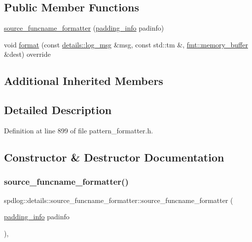 \subsection*{Public Member Functions}
\begin{DoxyCompactItemize}
\item 
\hyperlink{classspdlog_1_1details_1_1source__funcname__formatter_a1f20c622f780c9f9e8696e9c5960dcb8}{source\+\_\+funcname\+\_\+formatter} (\hyperlink{structspdlog_1_1details_1_1padding__info}{padding\+\_\+info} padinfo)
\item 
void \hyperlink{classspdlog_1_1details_1_1source__funcname__formatter_a7628b8914c638affa0bf0fc9de62f0e4}{format} (const \hyperlink{structspdlog_1_1details_1_1log__msg}{details\+::log\+\_\+msg} \&msg, const std\+::tm \&, \hyperlink{format_8h_a21cbf729f69302f578e6db21c5e9e0d2}{fmt\+::memory\+\_\+buffer} \&dest) override
\end{DoxyCompactItemize}
\subsection*{Additional Inherited Members}


\subsection{Detailed Description}


Definition at line 899 of file pattern\+\_\+formatter.\+h.



\subsection{Constructor \& Destructor Documentation}
\mbox{\label{classspdlog_1_1details_1_1source__funcname__formatter_a1f20c622f780c9f9e8696e9c5960dcb8}} 
\subsubsection{\texorpdfstring{source\+\_\+funcname\+\_\+formatter()}{source\_funcname\_formatter()}}
{\footnotesize\ttfamily spdlog\+::details\+::source\+\_\+funcname\+\_\+formatter\+::source\+\_\+funcname\+\_\+formatter (\begin{DoxyParamCaption}\item[{\hyperlink{structspdlog_1_1details_1_1padding__info}{padding\+\_\+info}}]{padinfo }\end{DoxyParamCaption})\hspace{0.3cm}{\ttfamily [inline]}, {\ttfamily [explicit]}}



